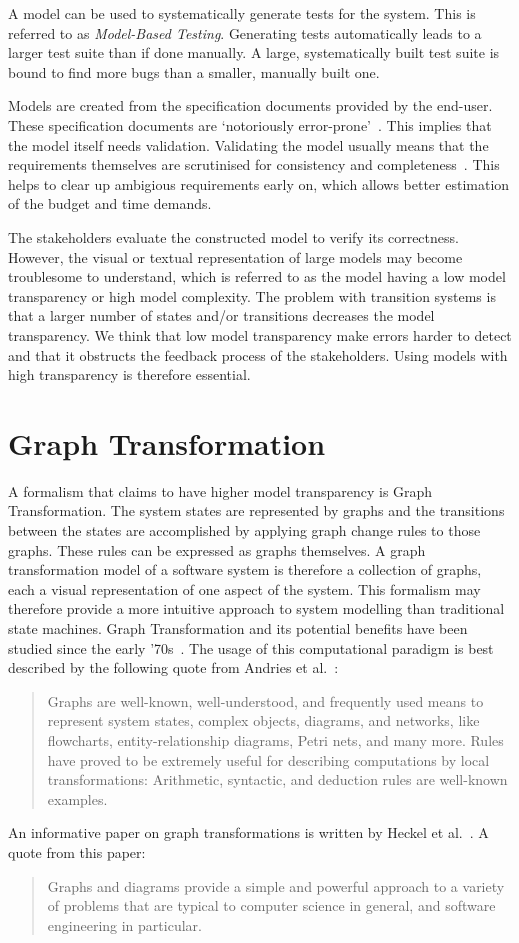 A model can be used to systematically generate tests for the system. This is referred to as \textit{Model-Based Testing}. Generating tests automatically leads to a larger test suite than if done manually. A large, systematically built test suite is bound to find more bugs than a smaller, manually built one.

Models are created from the specification documents provided by the end-user. These specification documents are `notoriously error-prone'~\cite{McCabe:testing}. This implies that the model itself needs validation. Validating the model usually means that the requirements themselves are scrutinised for consistency and completeness~\cite{Utting:MBTTaxonomy}. This helps to clear up ambigious requirements early on, which allows better estimation of the budget and time demands.

The stakeholders evaluate the constructed model to verify its correctness. However, the visual or textual representation of large models may become troublesome to understand, which is referred to as the model having a low model transparency or high model complexity. The problem with transition systems is that a larger number of states and/or transitions decreases the model transparency. We think that low model transparency make errors harder to detect and that it obstructs the feedback process of the stakeholders. Using models with high transparency is therefore essential.

\section{Graph Transformation}\label{sec:gg_intro}
A formalism that claims to have higher model transparency is Graph Transformation. The system states are represented by graphs and the transitions between the states are accomplished by applying graph change rules to those graphs. These rules can be expressed as graphs themselves. A graph transformation model of a software system is therefore a collection of graphs, each a visual representation of one aspect of the system. This formalism may therefore provide a more intuitive approach to system modelling than traditional state machines. Graph Transformation and its potential benefits have been studied since the early '70s~\cite{Pratt1971}. The usage of this computational paradigm is best described by the following quote from Andries et al.~\cite{Andries1999}: \begin{quote}Graphs are well-known, well-understood, and frequently used means to represent system states, complex objects, diagrams, and networks, like flowcharts, entity-relationship diagrams, Petri nets, and many more. Rules have proved to be extremely useful for describing computations by local transformations: Arithmetic, syntactic, and deduction rules are well-known examples.\end{quote} An informative paper on graph transformations is written by Heckel et al.~\cite{Heckel2006187}. A quote from this paper: \begin{quote}Graphs and diagrams provide a simple and powerful approach to a variety of problems that are typical to computer science in general, and software engineering in particular.\end{quote}

